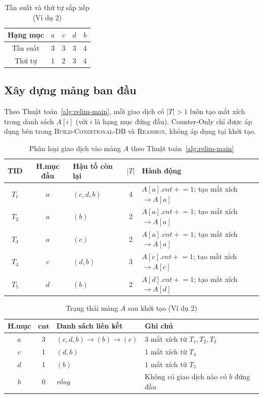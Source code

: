 \documentclass[12pt,a4paper]{report}
\begin{document}
\begin{table}[H]
  \centering
  \caption{Tần suất và thứ tự sắp xếp (Ví dụ 2)}
  \label{tab:ex2-freq}
  \begin{tabular}{ccccc}
    \toprule
    Hạng mục & $a$ & $c$ & $d$ & $b$ \\
    \midrule
    Tần suất & 3 & 3 & 3 & 4 \\
    Thứ tự   & 1 & 2 & 3 & 4 \\
    \bottomrule
  \end{tabular}
\end{table}
 
\subsection{Xây dựng mảng ban đầu}
 
Theo Thuật toán~\ref{alg:relim-main}, mỗi giao dịch có $|T| > 1$ luôn tạo mắt xích
trong danh sách $A[i]$ (với $i$ là hạng mục đứng đầu). Counter-Only chỉ được áp dụng
bên trong \textsc{Build-Conditional-DB} và \textsc{Reassign}, không áp dụng tại khởi tạo.
 
\begin{table}[H]
  \centering
  \caption{Phân loại giao dịch vào mảng $A$ theo Thuật toán~\ref{alg:relim-main}}
  \label{tab:ex2-init}
  \begin{tabular}{cclcl}
    \toprule
    \textbf{TID} & \textbf{H.mục đầu} & \textbf{Hậu tố còn lại} & \textbf{$|T|$} & \textbf{Hành động} \\
    \midrule
    $T_1$ & $a$ & $(c, d, b)$ & 4 & $A[a].cnt\mathrel{+}=1$; tạo mắt xích $\to A[a]$ \\
    $T_2$ & $a$ & $(b)$       & 2 & $A[a].cnt\mathrel{+}=1$; tạo mắt xích $\to A[a]$ \\
    $T_3$ & $a$ & $(c)$       & 2 & $A[a].cnt\mathrel{+}=1$; tạo mắt xích $\to A[a]$ \\
    $T_4$ & $c$ & $(d, b)$    & 3 & $A[c].cnt\mathrel{+}=1$; tạo mắt xích $\to A[c]$ \\
    $T_5$ & $d$ & $(b)$       & 2 & $A[d].cnt\mathrel{+}=1$; tạo mắt xích $\to A[d]$ \\
    \bottomrule
  \end{tabular}
\end{table}
 
\begin{table}[H]
  \centering
  \caption{Trạng thái mảng $A$ sau khởi tạo (Ví dụ 2)}
  \label{tab:ex2-array}
  \begin{tabular}{ccll}
    \toprule
    \textbf{H.mục} & $\mathbf{cnt}$ & \textbf{Danh sách liên kết} & \textbf{Ghi chú} \\
    \midrule
    $a$ & 3 & $(c,d,b) \to (b) \to (c)$ & 3 mắt xích từ $T_1, T_2, T_3$ \\
    $c$ & 1 & $(d,b)$   & 1 mắt xích từ $T_4$ \\
    $d$ & 1 & $(b)$     & 1 mắt xích từ $T_5$ \\
    $b$ & 0 & \textit{rỗng} & Không có giao dịch nào có $b$ đứng đầu \\
    \bottomrule
  \end{tabular}
\end{table}
 
\end{document}
